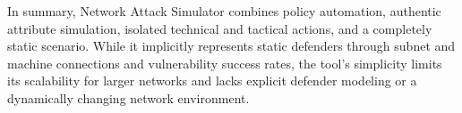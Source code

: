 In summary, Network Attack Simulator combines policy automation, authentic attribute simulation, isolated technical and tactical actions, and a completely static scenario. While it implicitly represents static defenders through subnet and machine connections and vulnerability success rates, the tool's simplicity limits its scalability for larger networks and lacks explicit defender modeling or a dynamically changing network environment.







